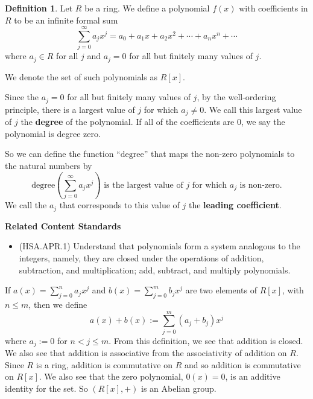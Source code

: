 \documentclass[
]{book}
\providecommand{\tightlist}{%
  \setlength{\itemsep}{0pt}\setlength{\parskip}{0pt}}
\newenvironment{standards}{}{}
\theoremstyle{definition}
\newtheorem{definition}{Definition}[chapter]
\theoremstyle{definition}
\theoremstyle{definition}
\theoremstyle{definition}
\theoremstyle{remark}
\begin{document}
\begin{definition}
Let \(R\) be a ring. We define a polynomial \(f(x)\) with coefficients in \(R\) to be an infinite formal sum \[\sum_{j=0}^\infty a_j x^j = a_0 + a_1 x+ a_2 x^2 + \cdots + a_n x^n + \cdots\] where \(a_j\in R\) for all \(j\) and \(a_j =0\) for all but finitely many values of \(j\).

We denote the set of such polynomials as \(R[x]\).
\end{definition}

Since the \(a_j=0\) for all but finitely many values of \(j\), by the well-ordering principle, there is a largest value of \(j\) for which \(a_j \neq 0\). We call this largest value of \(j\) the \textbf{degree} of the polynomial. If all of the coefficients are \(0\), we say the polynomial is degree zero.

So we can define the function ``\(\mathrm{degree}\)'' that maps the non-zero polynomials to the natural numbers by
\[\mathrm{degree}\left(\sum_{j=0}^\infty a_j x^j\right) \mbox{ is the largest value of $j$ for which $a_j$ is non-zero}.\] We call the \(a_j\) that corresponds to this value of \(j\) the \textbf{leading coefficient}.

\begin{standards}

\begin{center}
\textbf{Related Content Standards}

\end{center}

\begin{itemize}
\tightlist
\item
  (HSA.APR.1) Understand that polynomials form a system analogous to the integers, namely, they are closed under the operations of addition, subtraction, and multiplication; add, subtract, and multiply polynomials.
\end{itemize}

\end{standards}

If \(a(x)=\sum_{j=0}^n a_j x^j\) and \(b(x)=\sum_{j=0}^m b_j x^j\) are two elements of \(R[x]\), with \(n\leq m\), then we define
\[a(x)+b(x) := \sum_{j=0}^m (a_j+b_j) x^j\] where \(a_j:=0\) for \(n<j\leq m\). From this definition, we see that addition is closed. We also see that addition is associative from the associativity of addition on \(R\). Since \(R\) is a ring, addition is commutative on \(R\) and so addition is commutative on \(R[x]\). We also see that the zero polynomial, \(0(x)=0\), is an additive identity for the set. So \((R[x],+)\) is an Abelian group.
\end{document}
